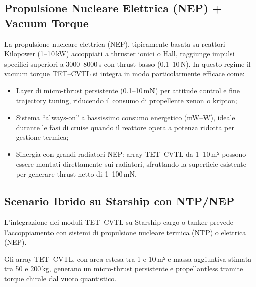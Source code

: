 \documentclass[11pt,a4paper]{article}
\theoremstyle{plain}
\theoremstyle{definition}
\begin{document}
\subsection{Propulsione Nucleare Elettrica (NEP) + Vacuum Torque}

\vspace{0.2cm}

La propulsione nucleare elettrica (NEP), tipicamente basata su reattori Kilopower (1–10\,kW) accoppiati a thruster ionici o Hall, raggiunge impulsi specifici superiori a 3000–8000\,s con thrust basso (0.1–10\,N). In questo regime il vacuum torque TET--CVTL si integra in modo particolarmente efficace come:

\vspace{0.2cm}

\begin{itemize}
    \item Layer di micro-thrust persistente (0.1–10\,mN) per attitude control e fine trajectory tuning, riducendo il consumo di propellente xenon o kripton;

    \vspace{0.2cm}
    \item Sistema “always-on” a bassissimo consumo energetico (mW–W), ideale durante le fasi di cruise quando il reattore opera a potenza ridotta per gestione termica;

    \vspace{0.2cm}
    \item Sinergia con grandi radiatori NEP: array TET--CVTL da 1–10\,m² possono essere montati direttamente sui radiatori, sfruttando la superficie esistente per generare thrust netto di 1–100\,mN.
\end{itemize}






\subsection{Scenario Ibrido su Starship con NTP/NEP}

\vspace{0.2cm}

L’integrazione dei moduli TET--CVTL su Starship cargo o tanker prevede l’accoppiamento con sistemi di propulsione nucleare termica (NTP) o elettrica (NEP). 

\vspace{0.3cm}


Gli array TET--CVTL, con area estesa tra 1 e 10\,m² e massa aggiuntiva stimata tra 50 e 200\,kg, generano un micro-thrust persistente e propellantless tramite torque chirale dal vuoto quantistico.
\end{document}

